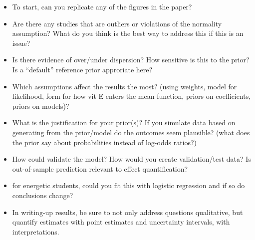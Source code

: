 \documentclass[12pt]{article}
\begin{document}
\begin{itemize}
\item To start, can you replicate any of the figures in the paper?
\item Are there any studies that are outliers or violations of the
  normality assumption?  What do you think is
  the best way to address this if this is an issue?
\item Is there evidence of over/under dispersion?  How sensitive is
  this to the prior?  Is a ``default'' reference prior approriate here?
\item Which assumptions affect the results the most?  (using weights,
  model for likelihood, form for how vit E enters the mean function,
  priors on coefficients, priors on models)?
\item What is the justification for your prior(s)?  If you simulate data
  based on generating from the prior/model do the outcomes seem
  plausible?  (what does the prior say about probabilities instead of
  log-odds ratios?)
\item How could validate the model?  How would you create
  validation/test data?   Is out-of-sample prediction relevant to
  effect quantification?
\item for energetic students,  could you fit this with logistic
  regression and if so do conclusions change?
\item In writing-up results, be sure to not only address questions
  qualitative, but quantify estimates with point estimates and
  uncertainty intervals, with interpretations.
\end{itemize}
\end{document}
